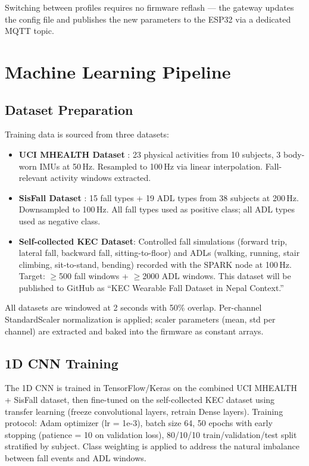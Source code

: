 Switching between profiles requires no firmware reflash --- the gateway updates the config file and publishes the new parameters to the ESP32 via a dedicated MQTT topic.

\section{Machine Learning Pipeline}

\subsection{Dataset Preparation}

Training data is sourced from three datasets:

\begin{itemize}
	\item \textbf{UCI MHEALTH Dataset} \cite{banos2014mhealthdroid}: 23 physical activities from 10 subjects, 3 body-worn IMUs at 50\,Hz. Resampled to 100\,Hz via linear interpolation. Fall-relevant activity windows extracted.
	\item \textbf{SisFall Dataset} \cite{sucerquia2017sisfall}: 15 fall types + 19 ADL types from 38 subjects at 200\,Hz. Downsampled to 100\,Hz. All fall types used as positive class; all ADL types used as negative class.
	\item \textbf{Self-collected KEC Dataset}: Controlled fall simulations (forward trip, lateral fall, backward fall, sitting-to-floor) and ADLs (walking, running, stair climbing, sit-to-stand, bending) recorded with the SPARK node at 100\,Hz. Target: $\geq$500 fall windows + $\geq$2000 ADL windows. This dataset will be published to GitHub as ``KEC Wearable Fall Dataset in Nepal Context.''
\end{itemize}
All datasets are windowed at 2 seconds with 50\% overlap. Per-channel StandardScaler normalization is applied; scaler parameters (mean, std per channel) are extracted and baked into the firmware as constant arrays.

\subsection{1D CNN Training}

The 1D CNN is trained in TensorFlow/Keras on the combined UCI MHEALTH + SisFall dataset, then fine-tuned on the self-collected KEC dataset using transfer learning (freeze convolutional layers, retrain Dense layers). Training protocol: Adam optimizer (lr = 1e-3), batch size 64, 50 epochs with early stopping (patience = 10 on validation loss), 80/10/10 train/validation/test split stratified by subject. Class weighting is applied to address the natural imbalance between fall events and ADL windows.


